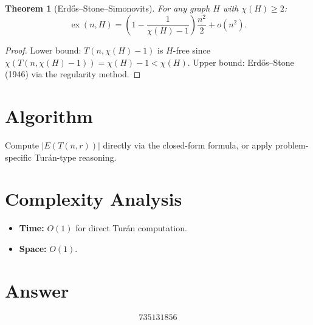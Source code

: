 \documentclass[11pt]{article}
\newtheorem{theorem}{Theorem}
\begin{document}
\begin{theorem}[Erd\H{o}s--Stone--Simonovits]
For any graph $H$ with $\chi(H) \ge 2$:
\[
\operatorname{ex}(n, H) = \left(1 - \frac{1}{\chi(H)-1}\right)\frac{n^2}{2} + o(n^2).
\]
\end{theorem}

\begin{proof}
Lower bound: $T(n, \chi(H)-1)$ is $H$-free since $\chi(T(n,\chi(H)-1)) = \chi(H)-1 < \chi(H)$. Upper bound: Erd\H{o}s--Stone (1946) via the regularity method.
\end{proof}

\section{Algorithm}

Compute $|E(T(n,r))|$ directly via the closed-form formula, or apply problem-specific Tur\'an-type reasoning.

\section{Complexity Analysis}

\begin{itemize}
\item \textbf{Time:} $O(1)$ for direct Tur\'an computation.
\item \textbf{Space:} $O(1)$.
\end{itemize}

\section{Answer}

\[
\boxed{735131856}
\]
\end{document}
